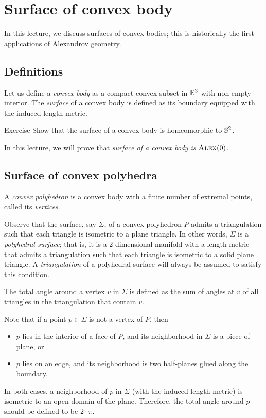 \chapter{Surface of convex body}\label{chap:convex-body}

In this lecture, we discuss surfaces of convex bodies;
this is historically the first applications of Alexandrov geometry.

\section{Definitions}

Let us define a \emph{convex body} as a compact convex subset in $\mathbb{E}^3$ with non-empty interior.
The \emph{surface} of a convex body is defined as its boundary equipped with the induced length metric.

\begin{thm}{Exercise}\label{ex:surf-S2}
Show that the surface of a convex body is homeomorphic to $\mathbb{S}^2$.
\end{thm}

In this lecture, we will prove that \textit{surface of a convex body is $\textsc{Alex}(0)$.}


\section{Surface of convex polyhedra}

A \emph{convex polyhedron} is a convex body with a finite number of extremal points, called its \emph{vertices}.

Observe that the  surface, say $\Sigma$, of a convex polyhedron $P$ admits a triangulation such that each triangle is isometric to a plane triangle.
In other words, $\Sigma$ is a \emph{polyhedral surface};
that is, it is a 2-dimensional manifold with a length metric that admits a triangulation such that each triangle is isometric to a solid plane triangle.
A \emph{triangulation} of a polyhedral surface will always be assumed to satisfy this condition.

The total angle around a vertex $v$ in $\Sigma$ is defined as the sum of angles at $v$ of all triangles in the triangulation that contain $v$.

Note that if a point $p\in \Sigma$ is not a vertex of $P$,
then
\begin{itemize}
\item $p$ lies in the interior of a face of $P$, and its neighborhood in $\Sigma$ is a piece of plane, or
\item $p$ lies on an edge, and its neighborhood is two half-planes glued along the boundary.
\end{itemize}
In both cases, a neighborhood of $p$ in $\Sigma$ (with the induced length metric) is isometric to an open domain of the plane.
Therefore, the total angle around $p$ should be defined to be $2\cdot\pi$.

